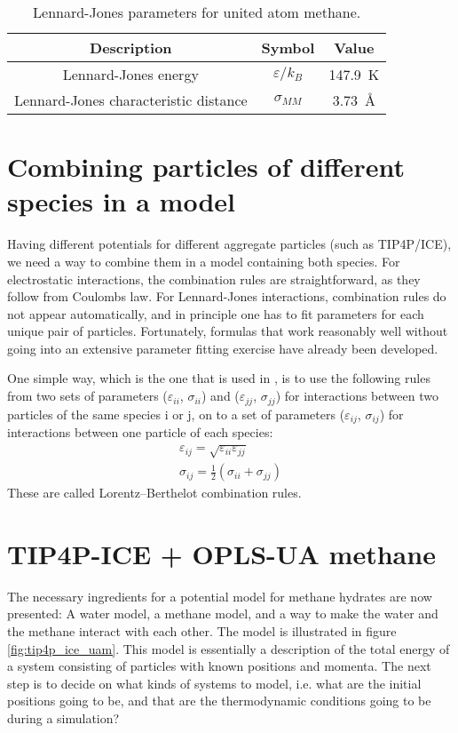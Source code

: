 \begin{table}
\caption{Lennard-Jones parameters for united atom methane.}
\label{tb:parameters_unitedatommethane}
\begin{center}
\begin{tabular}{c|c|c}
Description & Symbol & Value \\
\hline
Lennard-Jones energy & $\varepsilon/k_B$ & \SI{147.9}{\kelvin} \\
Lennard-Jones characteristic distance & $\sigma_{MM}$ & \SI{3.73}{\angstrom}
\end{tabular}
\end{center}
\end{table}



\section{Combining particles of different species in a model}
Having different potentials for different aggregate particles (such as TIP4P/ICE), we need a way to combine them in a model containing both species. For electrostatic interactions, the combination rules are straightforward, as they follow from Coulombs law. For Lennard-Jones interactions, combination rules do not appear automatically, and in principle one has to fit parameters for each unique pair of particles. Fortunately, formulas that work reasonably well without going into an extensive parameter fitting exercise have already been developed. 

One simple way, which is the one that is used in \citet{Walsh2009}, is to use the following rules from two sets of parameters ($\varepsilon_{ii}$, $\sigma_{ii}$) and ($\varepsilon_{jj}$, $\sigma_{jj}$) for interactions between two particles of the same species i or j, on to a set of parameters ($\varepsilon_{ij}$, $\sigma_{ij}$) for interactions between one particle of each species:
\begin{align}
\varepsilon_{ij} = \sqrt{\varepsilon_{ii}\varepsilon_{jj}} \\
\sigma_{ij} = \frac{1}{2} \left(\sigma_{ii}+\sigma_{jj}\right)
\end{align}
These are called Lorentz--Berthelot combination rules.

\section{TIP4P-ICE + OPLS-UA methane}
The necessary ingredients for a potential model for methane hydrates are now presented: A water model, a methane model, and a way to make the water and the methane interact with each other. The model is illustrated in figure \ref{fig:tip4p_ice_uam}. This model is essentially a description of the total energy of a system consisting of particles with known positions and momenta. The next step is to decide on what kinds of systems to model, i.e. what are the initial positions going to be, and that are the thermodynamic conditions going to be during a simulation?

